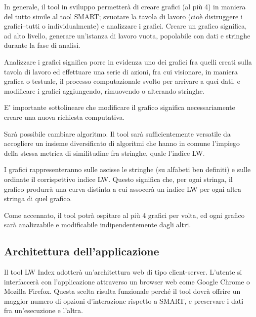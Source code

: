         In generale, il tool in sviluppo permetterà di creare grafici (al più 4) in maniera del tutto simile al tool SMART; svuotare la tavola di lavoro (cioè distruggere i grafici--tutti o individualmente) e analizzare i grafici. Creare un grafico significa, ad alto livello, generare un'istanza di lavoro vuota, popolabile con dati e stringhe durante la fase di analisi. 
        
        Analizzare i grafici significa porre in evidenza uno dei grafici fra quelli creati sulla tavola di lavoro ed effettuare una serie di azioni, fra cui visionare, in maniera grafica o testuale, il processo computazionale svolto per arrivare a quei dati, e modificare i grafici aggiungendo, rimuovendo o alterando stringhe. 
        
        \vspace{3mm}
        
        E' importante sottolineare che modificare il grafico significa necessariamente creare una nuova richiesta computativa.
        
        \vspace{3mm}
        
        Sarà possibile cambiare algoritmo. Il tool sarà sufficientemente versatile da accogliere un insieme diversificato di algoritmi che hanno in comune l'impiego della stessa metrica di similitudine fra stringhe, quale l'indice LW.
 
        \vspace{3mm}
 
        I grafici rappresenteranno sulle ascisse le stringhe (su alfabeti ben definiti) e sulle ordinate il corrispettivo indice LW. Questo significa che, per ogni stringa, il grafico produrrà una curva distinta a cui assocerà un indice LW per ogni altra stringa di quel grafico.  
        
        Come accennato, il tool potrà ospitare al più 4 grafici per volta, ed ogni grafico sarà analizzabile e modificabile indipendentemente dagli altri.

    \subsection{Architettura dell'applicazione}
    
        Il tool LW Index adotterà un'architettura web di tipo client-server. L'utente si interfaccerà con l'applicazione attraverso un browser web come Google Chrome o Mozilla Firefox. Questa scelta risulta funzionale perché il tool dovrà offrire un maggior numero di opzioni d'interazione rispetto a SMART, e preservare i dati fra un'esecuzione e l'altra.
        
